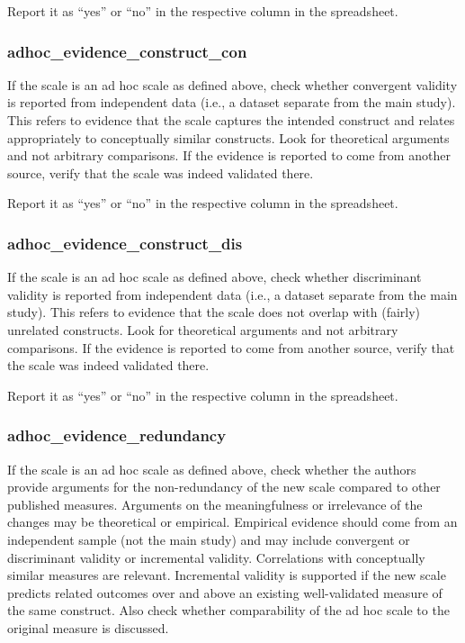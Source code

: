 {Report it as ``yes'' or ``no'' in the respective column in the spreadsheet.

\subsubsection*{adhoc\_evidence\_construct\_con}
\label{adhocconstructcon}
If the scale is an ad hoc scale as defined above, check whether convergent validity is reported from independent data (i.e., a dataset separate from the main study). This refers to evidence that the scale captures the intended construct and relates appropriately to conceptually similar constructs. Look for theoretical arguments and not arbitrary comparisons. If the evidence is reported to come from another source, verify that the scale was indeed validated there.

Report it as ``yes'' or ``no'' in the respective column in the spreadsheet.

\subsubsection*{adhoc\_evidence\_construct\_dis}
\label{adhocconstructdis}
If the scale is an ad hoc scale as defined above, check whether discriminant validity is reported from independent data (i.e., a dataset separate from the main study). This refers to evidence that the scale does not overlap with (fairly) unrelated constructs. Look for theoretical arguments and not arbitrary comparisons. If the evidence is reported to come from another source, verify that the scale was indeed validated there.

Report it as ``yes'' or ``no'' in the respective column in the spreadsheet.

\subsubsection*{adhoc\_evidence\_redundancy}
\label{adhocredundant}
If the scale is an ad hoc scale as defined above, check whether the authors provide arguments for the non-redundancy of the new scale compared to other published measures. Arguments on the meaningfulness or irrelevance of the changes may be theoretical or empirical. Empirical evidence should come from an independent sample (not the main study) and may include convergent or discriminant validity or incremental validity. Correlations with conceptually similar measures are relevant. Incremental validity is supported if the new scale predicts related outcomes over and above an existing well-validated measure of the same construct. Also check whether comparability of the ad hoc scale to the original measure is discussed.

}
